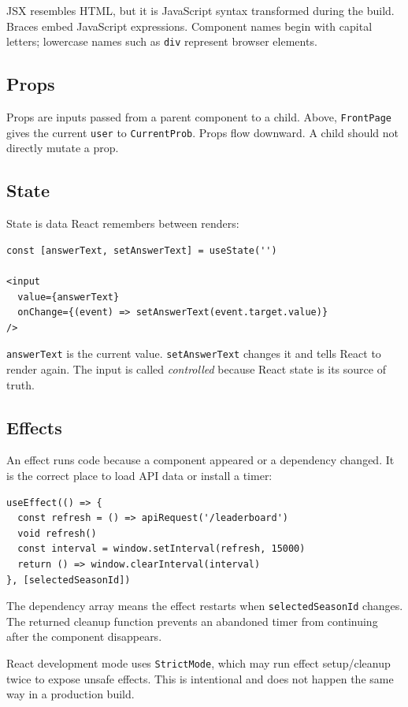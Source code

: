 \documentclass[11pt,oneside]{book}
\newcommand{\code}[1]{\texttt{#1}}
\begin{document}
JSX resembles HTML, but it is JavaScript syntax transformed during the build. Braces embed JavaScript expressions. Component names begin with capital letters; lowercase names such as \code{div} represent browser elements.

\subsection{Props}
Props are inputs passed from a parent component to a child. Above, \code{FrontPage} gives the current \code{user} to \code{CurrentProb}. Props flow downward. A child should not directly mutate a prop.

\subsection{State}
State is data React remembers between renders:

\begin{lstlisting}
const [answerText, setAnswerText] = useState('')

<input
  value={answerText}
  onChange={(event) => setAnswerText(event.target.value)}
/>
\end{lstlisting}

\code{answerText} is the current value. \code{setAnswerText} changes it and tells React to render again. The input is called \emph{controlled} because React state is its source of truth.

\subsection{Effects}
An effect runs code because a component appeared or a dependency changed. It is the correct place to load API data or install a timer:

\begin{lstlisting}
useEffect(() => {
  const refresh = () => apiRequest('/leaderboard')
  void refresh()
  const interval = window.setInterval(refresh, 15000)
  return () => window.clearInterval(interval)
}, [selectedSeasonId])
\end{lstlisting}

The dependency array means the effect restarts when \code{selectedSeasonId} changes. The returned cleanup function prevents an abandoned timer from continuing after the component disappears.

\begin{warningbox}
React development mode uses \code{StrictMode}, which may run effect setup/cleanup twice to expose unsafe effects. This is intentional and does not happen the same way in a production build.
\end{warningbox}
\end{document}
